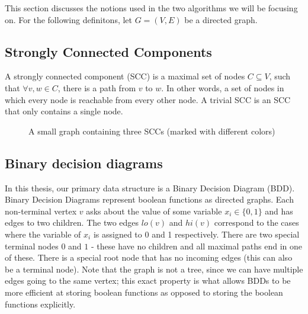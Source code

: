 \documentclass[../master/master.tex]{subfiles}
\begin{document}
This section discusses the notions used in the two algorithms we will be focusing on. For the following definitons, let $G=(V,E)$ be a directed graph.

\subsection{Strongly Connected Components}
A strongly connected component (SCC) is a maximal set of nodes $C\subseteq V$, such that $\forall v,w\in C$, there is a path from $v$ to $w$. In other words, a set of nodes in which every node is reachable from every other node. A trivial SCC is an SCC that only contains a single node.
\begin{figure}[H]
\center
{}
\caption{A small graph containing three SCCs (marked with different colors)}
\end{figure}

\subsection{Binary decision diagrams}
In this thesis, our primary data structure is a Binary Decision Diagram (BDD). Binary Decision Diagrams represent boolean functions as directed graphs. Each non-terminal vertex $v$ asks about the value of some variable $x_i\in \{0,1\}$ and has edges to two children. The two edges $lo(v)$ and $hi(v)$ correspond to the cases where the variable of $x_i$ is assigned to 0 and 1 respectively. There are two special terminal nodes $0$ and $1$ - these have no children and all maximal paths end in one of these. There is a special root node that has no incoming edges (this can also be a terminal node). Note that the graph is not a tree, since we can have multiple edges going to the same vertex; this exact property is what allows BDDs to be more efficient at storing boolean functions as opposed to storing the boolean functions explicitly.
\end{document}
